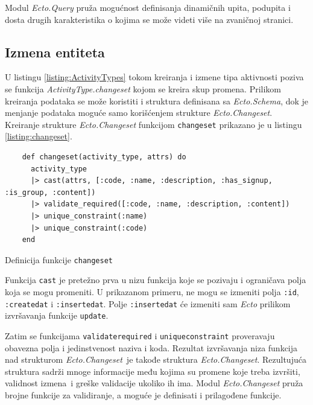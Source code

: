 \documentclass[12pt,oneside]{memoir}
\begin{document}
Modul \emph{Ecto.Query} pruža mogućnost definisanja dinamičnih upita, podupita i dosta drugih karakteristika o kojima se može videti više na zvaničnoj stranici.

\subsection{Izmena entiteta}
U listingu \ref{listing:ActivityTypes} tokom kreiranja i izmene tipa aktivnosti poziva se
funkcija \emph{ActivityType.changeset} kojom se kreira skup promena. Prilikom kreiranja
podataka se može koristiti i struktura definisana sa \emph{Ecto.Schema}, dok je 
menjanje podataka moguće samo korišćenjem strukture \emph{Ecto.Changeset}.
Kreiranje strukture \emph{Ecto.Changeset} funkcijom \texttt{changeset} 
prikazano je u listingu \ref{listing:changeset}. 
\begin{listing}[!h]
\begin{verbatim}
    def changeset(activity_type, attrs) do
      activity_type
      |> cast(attrs, [:code, :name, :description, :has_signup, :is_group, :content])
      |> validate_required([:code, :name, :description, :content])
      |> unique_constraint(:name)
      |> unique_constraint(:code)
    end
\end{verbatim}
\caption{Definicija funkcije \texttt{changeset}}
\label{listing:changeset}
\end{listing}

Funkcija \texttt{cast} je pretežno prva u nizu funkcija koje se pozivaju i ograničava polja koja se mogu promeniti.
U prikazanom primeru, ne mogu se izmeniti polja \texttt{:id}, \texttt{:created{\textunderscore}at} i
\texttt{:inserted{\textunderscore}at}. Polje \texttt{:inserted{\textunderscore}at} će izmeniti sam \emph{Ecto}
prilikom izvršavanja funkcije \texttt{update}.

Zatim se funkcijama \texttt{validate{\textunderscore}required} i \texttt{unique{\textunderscore}constraint} 
proveravaju obavezna polja i jedinstvenost naziva i koda. Rezultat izvršavanja niza funkcija nad strukturom
\emph{Ecto.Changeset} je takođe struktura \emph{Ecto.Changeset}. Rezultujuća struktura sadrži mnoge informacije
među kojima su promene koje treba izvršiti, validnost izmena i greške validacije ukoliko ih ima.
Modul \emph{Ecto.Changeset} pruža brojne funkcije za validiranje, a moguće je definisati i prilagođene funkcije.
\end{document}
